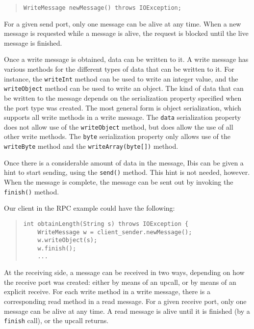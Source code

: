\documentclass[10pt]{article}
\begin{document}
\begin{quote}
\begin{verbatim}
WriteMessage newMessage() throws IOException;
\end{verbatim}
\end{quote}

For a given send port, only one message can be alive at any time.
When a new message is requested while a message is alive, the request
is blocked until the live message is finished.

Once a write message is obtained, data can be written to it.
A write message has various methods for the different types of
data that can be written to it. For instance, the
\verb+writeInt+ method can be used to write an integer value,
and the \verb+writeObject+ method can be used to write an object.
The kind of data that can be written to the message depends on the
serialization property specified when the port type was created.
The most general form is object serialization, which supports 
all write methods in a write message.
The \verb+data+ serialization property does not allow use of the
\verb+writeObject+ method, but does allow the use of all other write
methods. The \verb+byte+ serialization property only allows use
of the \verb+writeByte+ method and the \verb+writeArray(byte[])+
method.

Once there is a considerable amount of data in the message, Ibis
can be given a hint to start sending, using the \verb+send()+
method. This hint is not needed, however. When the message is
complete, the message can be sent out by invoking the
\verb+finish()+ method.

Our client in the RPC example could have the following:
\begin{quote}
\begin{verbatim}
int obtainLength(String s) throws IOException {
    WriteMessage w = client_sender.newMessage();
    w.writeObject(s);
    w.finish();
    ...
\end{verbatim}
\end{quote}

At the receiving side, a message can be received in two ways,
depending on how the receive port was created: either by means of an
upcall, or by means of an explicit receive. For each write method
in a write message, there is a corresponding read method in
a read message. For a given receive port, only one message can
be alive at any time. A read message is alive until it is
finished (by a \verb+finish+ call), or the upcall returns.
\end{document}
